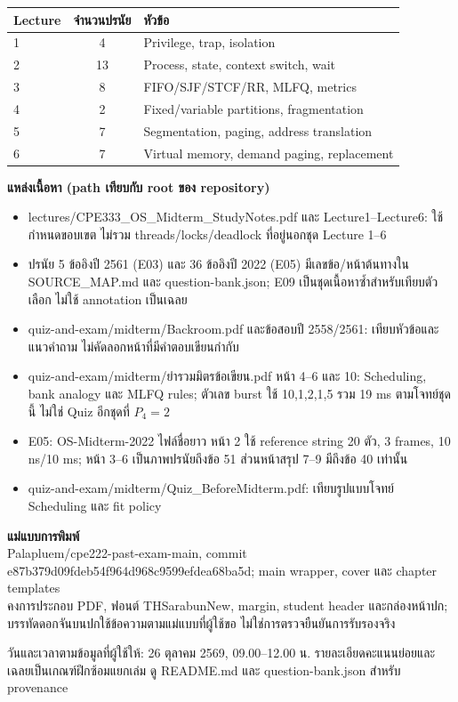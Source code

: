 \begin{center}\renewcommand{\arraystretch}{1.15}\begin{tabular}{lcl}
Lecture & จำนวนปรนัย & หัวข้อ\\\hline
1 & 4 & Privilege, trap, isolation\\
2 & 13 & Process, state, context switch, wait\\
3 & 8 & FIFO/SJF/STCF/RR, MLFQ, metrics\\
4 & 2 & Fixed/variable partitions, fragmentation\\
5 & 7 & Segmentation, paging, address translation\\
6 & 7 & Virtual memory, demand paging, replacement\\
\end{tabular}\end{center}
\noindent\textbf{แหล่งเนื้อหา (path เทียบกับ root ของ repository)}
\begin{itemize}[leftmargin=1.4em,itemsep=.18cm]
\item lectures/CPE333\_OS\_Midterm\_StudyNotes.pdf และ Lecture1--Lecture6: ใช้กำหนดขอบเขต ไม่รวม threads/locks/deadlock ที่อยู่นอกชุด Lecture 1--6
\item ปรนัย 5 ข้ออิงปี 2561 (E03) และ 36 ข้ออิงปี 2022 (E05) มีเลขข้อ/หน้าต้นทางใน SOURCE\_MAP.md และ question-bank.json; E09 เป็นชุดเนื้อหาซ้ำสำหรับเทียบตัวเลือก ไม่ใช้ annotation เป็นเฉลย
\item quiz-and-exam/midterm/Backroom.pdf และข้อสอบปี 2558/2561: เทียบหัวข้อและแนวคำถาม ไม่คัดลอกหน้าที่มีคำตอบเขียนกำกับ
\item quiz-and-exam/midterm/ยำรวมมิตรข้อเขียน.pdf หน้า 4--6 และ 10: Scheduling, bank analogy และ MLFQ rules; ตัวเลข burst ใช้ 10,1,2,1,5 รวม 19 ms ตามโจทย์ชุดนี้ ไม่ใช่ Quiz อีกชุดที่ $P_4=2$
\item E05: OS-Midterm-2022 ไฟล์ชื่อยาว หน้า 2 ใช้ reference string 20 ตัว, 3 frames, 10 ns/10 ms; หน้า 3--6 เป็นภาพปรนัยถึงข้อ 51 ส่วนหน้าสรุป 7--9 มีถึงข้อ 40 เท่านั้น
\item quiz-and-exam/midterm/Quiz\_BeforeMidterm.pdf: เทียบรูปแบบโจทย์ Scheduling และ fit policy
\end{itemize}
\noindent\textbf{แม่แบบการพิมพ์}\\
Palapluem/cpe222-past-exam-main, commit e87b379d09fdeb54f964d968c9599efdea68ba5d; main wrapper, cover และ chapter templates\\
คงการประกอบ PDF, ฟอนต์ THSarabunNew, margin, student header และกล่องหน้าปก; บรรทัดดอกจันบนปกใช้ข้อความตามแม่แบบที่ผู้ใช้ขอ ไม่ใช่การตรวจยืนยันการรับรองจริง
\par\medskip
\noindent วันและเวลาตามข้อมูลที่ผู้ใช้ให้: 26 ตุลาคม 2569, 09.00--12.00 น. รายละเอียดคะแนนย่อยและเฉลยเป็นเกณฑ์ฝึกซ้อมแยกเล่ม ดู README.md และ question-bank.json สำหรับ provenance
